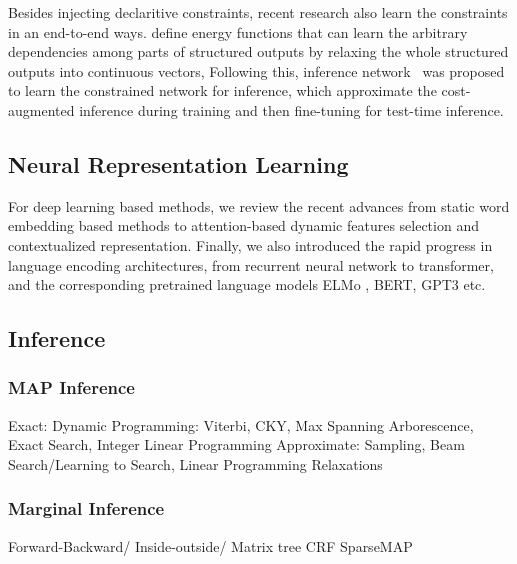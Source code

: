 Besides injecting declaritive constraints, recent research also learn
the constraints in an end-to-end
ways. \citet[SPEN,][]{belanger2016structured} define energy functions
that can learn the arbitrary dependencies among parts of structured
outputs by relaxing the whole structured outputs into continuous
vectors, Following this, inference network~\cite{tu2018learning} was
proposed to learn the constrained network for inference, which
approximate the cost-augmented inference during training and then
fine-tuning for test-time inference.

\subsection{Neural Representation Learning}
\label{ssec:bg:rep-learning}
For deep learning based methods, we review the recent advances from
static word embedding based methods to attention-based dynamic
features selection and contextualized representation. Finally, we also
introduced the rapid progress in language encoding architectures, from
recurrent neural network to transformer, and the corresponding
pretrained language models ELMo , BERT, GPT3 etc.






\subsection{Inference}
\label{ssec:bg:inference}
\subsubsection{MAP Inference}
Exact: Dynamic Programming: Viterbi, CKY, Max Spanning Arborescence, Exact Search, Integer Linear Programming
Approximate: Sampling, Beam Search/Learning to Search, Linear Programming Relaxations

\subsubsection{Marginal Inference}
Forward-Backward/ Inside-outside/ Matrix tree
CRF
SparseMAP


